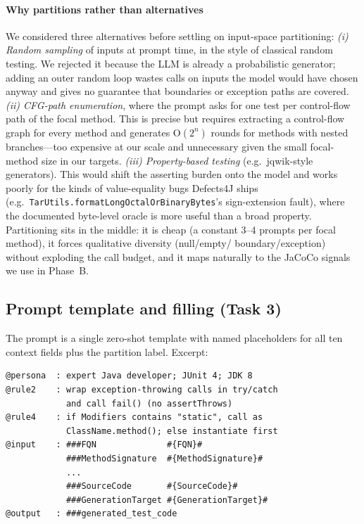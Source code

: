 \documentclass[conference]{IEEEtran}
\begin{document}
\paragraph*{Why partitions rather than alternatives}
We considered three alternatives before settling on input-space
partitioning:
\emph{(i) Random sampling} of inputs at prompt time, in the style of
classical random testing. We rejected it because the LLM is already a
probabilistic generator; adding an outer random loop wastes calls on
inputs the model would have chosen anyway and gives no guarantee that
boundaries or exception paths are covered.
\emph{(ii) CFG-path enumeration}, where the prompt asks for one test
per control-flow path of the focal method. This is precise but
requires extracting a control-flow graph for every method and
generates O$(2^n)$ rounds for methods with nested branches---too
expensive at our scale and unnecessary given the small focal-method
size in our targets.
\emph{(iii) Property-based testing} (e.g.\ jqwik-style generators).
This would shift the asserting burden onto the model and works poorly
for the kinds of value-equality bugs Defects4J ships
(e.g.\ \texttt{TarUtils.formatLongOctalOrBinaryBytes}'s sign-extension
fault), where the documented byte-level oracle is more useful than a
broad property.
Partitioning sits in the middle: it is cheap (a constant 3--4 prompts
per focal method), it forces qualitative diversity (null/empty/
boundary/exception) without exploding the call budget, and it maps
naturally to the JaCoCo signals we use in Phase~B.

\subsection{Prompt template and filling (Task 3)}
The prompt is a single zero-shot template with named placeholders for
all ten context fields plus the partition label. Excerpt:

\begin{lstlisting}[basicstyle=\ttfamily\scriptsize]
@persona  : expert Java developer; JUnit 4; JDK 8
@rule2    : wrap exception-throwing calls in try/catch
            and call fail() (no assertThrows)
@rule4    : if Modifiers contains "static", call as
            ClassName.method(); else instantiate first
@input    : ###FQN              #{FQN}#
            ###MethodSignature  #{MethodSignature}#
            ...
            ###SourceCode       #{SourceCode}#
            ###GenerationTarget #{GenerationTarget}#
@output   : ###generated_test_code
\end{lstlisting}
\end{document}
